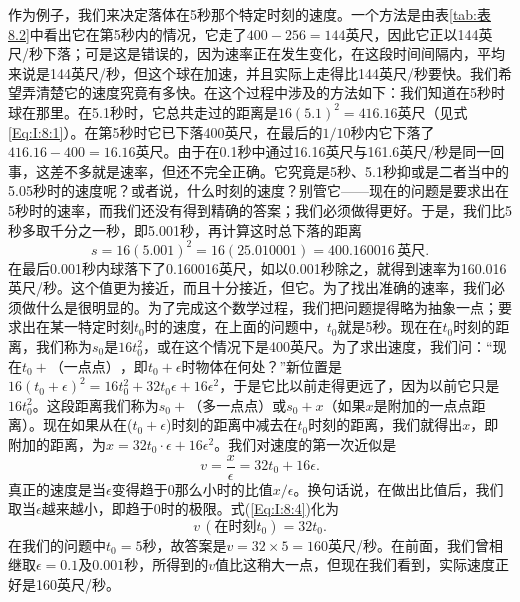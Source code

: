 作为例子，我们来决定落体在5秒那个特定时刻的速度。一个方法是由表\ref{tab:表8.2}中看出它在第5秒内的情况，它走了$400-256=144$英尺，因此它正以144英尺/秒下落；可是这是错误的，因为速率正在发生变化，在这段时间间隔内，平均来说是144英尺/秒，但这个球在加速，并且实际上走得比144英尺/秒要快。我们希望弄清楚它的速度究竟有多快。在这个过程中涉及的方法如下：我们知道在5秒时球在那里。在5.1秒时，它总共走过的距离是$16(5.1)^2=416.16$英尺（见式\ref{Eq:I:8:1}）。在第5秒时它已下落400英尺，在最后的$1/10$秒内它下落了$416.16-400=16.16$英尺。由于在0.1秒中通过16.16英尺与161.6英尺/秒是同一回事，这差不多就是速率，但还不完全正确。它究竟是5秒、5.1秒抑或是二者当中的5.05秒时的速度呢？或者说，什么时刻的速度？别管它——现在的问题是要求出在5秒时的速率，而我们还没有得到精确的答案；我们必须做得更好。于是，我们比5秒多取千分之一秒，即5.001秒，再计算这时总下落的距离
\begin{equation*}
s=16(5.001)^2=16(25.010001)=400.160016 \,\textrm{英尺}.
\end{equation*}
在最后0.001秒内球落下了0.160016英尺，如以0.001秒除之，就得到速率为160.016英尺/秒。这个值更为接近，而且十分接近，但它。为了找出准确的速率，我们必须做什么是很明显的。为了完成这个数学过程，我们把问题提得略为抽象一点；要求出在某一特定时刻$t_0$时的速度，在上面的问题中，$t_0$就是5秒。现在在$t_0$时刻的距离，我们称为$s_0$是$16t_0^2$，或在这个情况下是400英尺。为了求出速度，我们问：“现在$t_0+\textrm{（一点点）}$，即$t_0+\epsilon$时物体在何处？”新位置是$16(t_0+\epsilon)^2=16t_0^2+32t_0\epsilon+16\epsilon^2$，于是它比以前走得更远了，因为以前它只是$16t_0^2$。这段距离我们称为$s_0+\textrm{（多一点点）}$或$s_0+x$（如果$x$是附加的一点点距离）。现在如果从在($t_0+\epsilon$)时刻的距离中减去在$t_0$时刻的距离，我们就得出$x$，即附加的距离，为$x=32t_0\cdot\epsilon+16\epsilon^2$。我们对速度的第一次近似是
\begin{equation}
\label{Eq:I:8:4}
v=\frac{x}{\epsilon}=32t_0+16\epsilon.
\end{equation}
真正的速度是当$\epsilon$变得趋于0那么小时的比值$x/\epsilon$。换句话说，在做出比值后，我们取当$\epsilon$越来越小，即趋于0时的极限。式(\ref{Eq:I:8:4})化为
\begin{equation*}
v\,(\textrm{在时刻$t_0$})=32t_0.
\end{equation*}
在我们的问题中$t_0=5$秒，故答案是$v=32\times5=160$英尺/秒。在前面，我们曾相继取$\epsilon=0.1$及$0.001$秒，所得到的$v$值比这稍大一点，但现在我们看到，实际速度正好是160英尺/秒。




